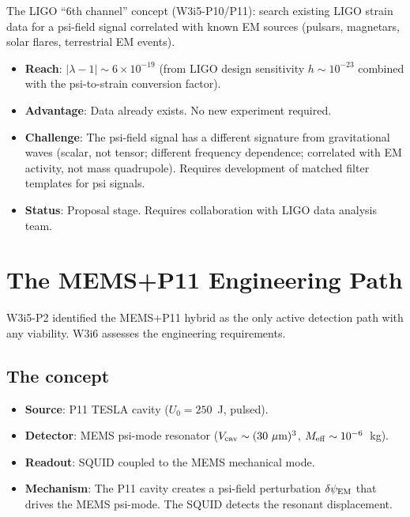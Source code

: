 \documentclass[11pt]{article}
\newcommand{\lam}{\lambda}
\newcommand{\Meff}{M_{\rm eff}}
\newcommand{\ee}[1]{\times 10^{#1}}
\newcommand{\Vcav}{V_{\rm cav}}
\newcommand{\lbone}{|\lam - 1|}
\newcommand{\dpsiEM}{\delta\psi_{\rm EM}}
\theoremstyle{definition}
\theoremstyle{remark}
\begin{document}
The LIGO ``6th channel'' concept (W3i5-P10/P11): search existing LIGO
strain data for a psi-field signal correlated with known EM sources
(pulsars, magnetars, solar flares, terrestrial EM events).

\begin{itemize}[nosep]
\item \textbf{Reach}: $\lbone \sim 6\ee{-19}$ (from LIGO design sensitivity
  $h \sim 10^{-23}$ combined with the psi-to-strain conversion factor).
\item \textbf{Advantage}: Data already exists. No new experiment required.
\item \textbf{Challenge}: The psi-field signal has a different signature
  from gravitational waves (scalar, not tensor; different frequency
  dependence; correlated with EM activity, not mass quadrupole).
  Requires development of matched filter templates for psi signals.
\item \textbf{Status}: Proposal stage. Requires collaboration with LIGO
  data analysis team.
\end{itemize}

\section{The MEMS+P11 Engineering Path}
\label{sec:MEMS_engineering}

W3i5-P2 identified the MEMS+P11 hybrid as the only active detection
path with any viability. W3i6 assesses the engineering requirements.

\subsection{The concept}
\label{ssec:MEMS_concept}

\begin{itemize}[nosep]
\item \textbf{Source}: P11 TESLA cavity ($U_0 = 250$~J, pulsed).
\item \textbf{Detector}: MEMS psi-mode resonator ($\Vcav \sim (30~\mu\text{m})^3$,
  $\Meff \sim 10^{-6}$~kg).
\item \textbf{Readout}: SQUID coupled to the MEMS mechanical mode.
\item \textbf{Mechanism}: The P11 cavity creates a psi-field perturbation
  $\dpsiEM$ that drives the MEMS psi-mode. The SQUID detects the
  resonant displacement.
\end{itemize}
\end{document}
